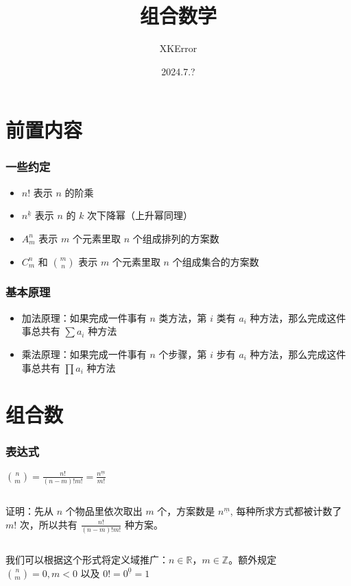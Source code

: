 \documentclass{beamer}
\title{组合数学}
\author{XKError}
\date{2024.7.?}
\begin{document}

\frame{\titlepage}

\section{前置内容}

\begin{frame}
\frametitle{一些约定}
\begin{itemize}
\item $n!$ 表示 $n$ 的阶乘
\item $n^{\underline{k}}$ 表示 $n$ 的 $k$ 次下降幂（上升幂同理）
\item $A_m^n$ 表示 $m$ 个元素里取 $n$ 个组成排列的方案数
\item $C_m^n$ 和 $\binom m n$ 表示 $m$ 个元素里取 $n$ 个组成集合的方案数
\end{itemize}

\end{frame}


\begin{frame}
\frametitle{基本原理}

\begin{itemize}
\item 加法原理：如果完成一件事有 $n$ 类方法，第 $i$ 类有 $a_i$ 种方法，那么完成这件事总共有 $\sum{a_i}$ 种方法
\item 乘法原理：如果完成一件事有 $n$ 个步骤，第 $i$ 步有 $a_i$ 种方法，那么完成这件事总共有 $\prod{a_i}$ 种方法
\end{itemize}

\end{frame}

\section{组合数}

\begin{frame}
\frametitle{表达式}

    $\binom n m = \frac{n!}{(n-m)!m!} = \frac{n^{\underline m}}{m!}$

    $ $
    \pause
    
    证明：先从 $n$ 个物品里依次取出 $m$ 个，方案数是 $n^{\underline m}$, 每种所求方式都被计数了 $m!$ 次，所以共有 $\frac {n!}{(n-m)!m!}$ 种方案。

    $ $
    \pause
    
    我们可以根据这个形式将定义域推广：$n\in\mathbb{R}，m\in\mathbb{Z}$。额外规定 $\binom nm = 0,m<0$ 以及 $0!=0^{\underline 0} = 1$

\end{frame}
\end{document}

